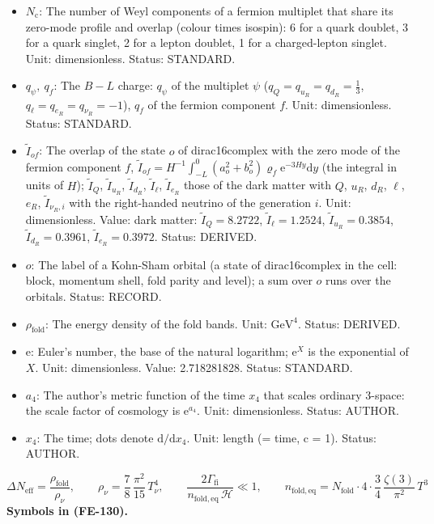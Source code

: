\documentclass[
  10pt,
]{article}
\begin{document}
\begin{itemize}
  medium (electron, proton, neutron); a sum over \(f\) runs over these
  species. Status: STANDARD.
\item
  \(N_{\mathrm{c}}\): The number of Weyl components of a fermion
  multiplet that share its zero-mode profile and overlap (colour times
  isospin): 6 for a quark doublet, 3 for a quark singlet, 2 for a lepton
  doublet, 1 for a charged-lepton singlet. Unit: dimensionless. Status:
  STANDARD.
\item
  \(q_\psi,\ q_f\): The \(B - L\) charge: \(q_\psi\) of the multiplet
  \(\psi\) (\(q_Q = q_{u_R} = q_{d_R} = \frac13\),
  \(q_\ell = q_{e_R} = q_{\nu_R} = -1\)), \(q_f\) of the fermion
  component \(f\). Unit: dimensionless. Status: STANDARD.
\item
  \(\tilde I_{of}\): The overlap of the state \(o\) of dirac16complex
  with the zero mode of the fermion component \(f\),
  \(\tilde I_{of} = H^{-1}\int_{-L}^{0}(a_o^2 + b_o^2)\varrho_f\mathrm{e}^{-3Hy}\mathrm{d}y\)
  (the integral in units of \(H\)); \(\tilde I_Q\), \(\tilde I_{u_R}\),
  \(\tilde I_{d_R}\), \(\tilde I_\ell\), \(\tilde I_{e_R}\) those of the
  dark matter with \(Q\), \(u_R\), \(d_R\), \(\ell\), \(e_R\),
  \(\tilde I_{\nu_R,i}\) with the right-handed neutrino of the
  generation \(i\). Unit: dimensionless. Value: dark matter:
  \(\tilde I_Q = 8.2722\), \(\tilde I_\ell = 1.2524\),
  \(\tilde I_{u_R} = 0.3854\), \(\tilde I_{d_R} = 0.3961\),
  \(\tilde I_{e_R} = 0.3972\). Status: DERIVED.
\item
  \(o\): The label of a Kohn-Sham orbital (a state of dirac16complex in
  the cell: block, momentum shell, fold parity and level); a sum over
  \(o\) runs over the orbitals. Status: RECORD.
\item
  \(\rho_{\mathrm{fold}}\): The energy density of the fold bands. Unit:
  \(\mathrm{GeV}^{4}\). Status: DERIVED.
\item
  \(\mathrm{e}\): Euler's number, the base of the natural logarithm;
  \(\mathrm{e}^{X}\) is the exponential of \(X\). Unit: dimensionless.
  Value: 2.718281828. Status: STANDARD.
\item
  \(a_4\): The author's metric function of the time \(x_4\) that scales
  ordinary 3-space: the scale factor of cosmology is
  \(\mathrm{e}^{a_4}\). Unit: dimensionless. Status: AUTHOR.
\item
  \(x_4\): The time; dots denote \(\mathrm{d}/\mathrm{d}x_4\). Unit:
  length (= time, c = 1). Status: AUTHOR.
\end{itemize}

\[
\Delta N_{\mathrm{eff}} = \frac{\rho_{\mathrm{fold}}}{\rho_\nu},\qquad \rho_\nu =
 \frac78\,\frac{\pi^2}{15}\,T_\nu^4,\qquad
\frac{2\Gamma_{\mathrm{fi}}}{n_{\mathrm{fold,eq}}\,\mathcal{H}} \ll 1,\qquad
n_{\mathrm{fold,eq}} = N_{\mathrm{fold}}\cdot4\cdot\frac34\,\frac{\zeta(3)}{\pi^2}\,T^3 \tag{FE-130}
\] \textbf{Symbols in (FE-130).}
\end{document}
